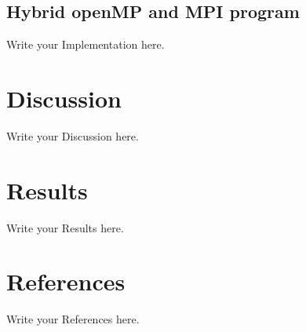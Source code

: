 \documentclass[12pt]{article}
\begin{document}
	\subsection{Hybrid openMP and MPI program}
	Write your Implementation here.
	
	\section{Discussion}
	Write your Discussion here.	
	
	\section{Results}
	Write your Results here.
	
	
	\section{References}
	Write your References here.
	
	
\end{document}
